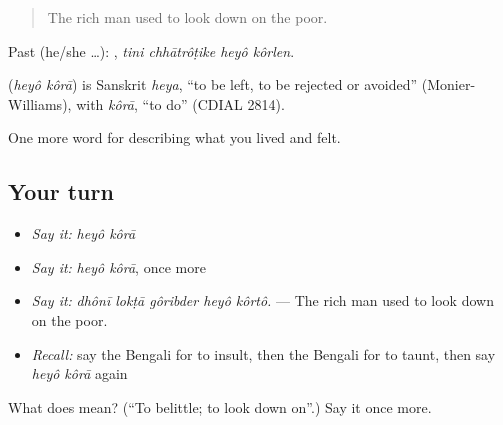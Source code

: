 \begin{quote}
The rich man used to look down on the poor.
\end{quote}

Past (he/she …):    , \emph{tini chhātrôṭike heyô kôrlen}.

\begin{cousinweb}
\textbf{ } (\emph{heyô kôrā}) is Sanskrit \emph{heya}, \textquotedblleft{}to be left, to be rejected or avoided\textquotedblright{} (Monier-Williams), with \emph{kôrā}, \textquotedblleft{}to do\textquotedblright{} (CDIAL 2814).
\end{cousinweb}

\begin{grammarlens}[title={What you've built}]
One more word for describing what you lived and felt.
\end{grammarlens}

\subsection*{Your turn}
\begin{itemize}
\raggedright
  \item \emph{Say it:} \emph{heyô kôrā}
  \item \emph{Say it:} \emph{heyô kôrā}, once more
  \item \emph{Say it:} \emph{dhônī lokṭā gôribder heyô kôrtô.} — The rich man used to look down on the poor.
  \item \emph{Recall:} say the Bengali for to insult, then the Bengali for to taunt, then say \emph{heyô kôrā} again
\end{itemize}

\begin{tcolorbox}[breakable,colback=teal!4,colframe=teal!35!black,title={Before you move on}]
What does   mean? (\textquotedblleft{}To belittle; to look down on\textquotedblright{}.) Say it once more.
\end{tcolorbox}
